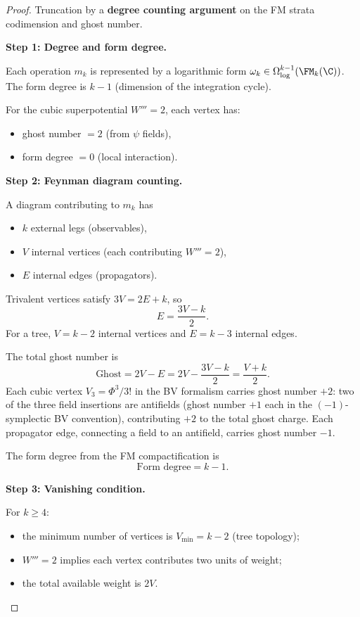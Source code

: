 \begin{proof}
Truncation by a \textbf{degree counting argument} on the FM strata codimension and ghost number.

\textbf{Step 1: Degree and form degree.}

Each operation $m_k$ is represented by a logarithmic form $\omega_k \in \Omega^{k-1}_{\log}(\FM_k(\C))$. The form degree is $k-1$ (dimension of the integration cycle).

For the cubic superpotential $W''' = 2$, each vertex has:
\begin{itemize}
\item ghost number $= 2$ (from $\psi$ fields),
\item form degree $= 0$ (local interaction).
\end{itemize}

\textbf{Step 2: Feynman diagram counting.}

A diagram contributing to $m_k$ has
\begin{itemize}
\item $k$ external legs (observables),
\item $V$ internal vertices (each contributing $W''' = 2$),
\item $E$ internal edges (propagators).
\end{itemize}

Trivalent vertices satisfy $3V = 2E + k$, so
\begin{equation}
E = \frac{3V - k}{2}.
\end{equation}
For a tree, $V = k - 2$ internal vertices and $E = k - 3$ internal edges.

The total ghost number is
\begin{equation}
\text{Ghost} = 2V - E = 2V - \frac{3V-k}{2} = \frac{V + k}{2}.
\end{equation}
Each cubic vertex $V_3 = \Phi^3/3!$ in the BV formalism carries ghost number $+2$: two of the three field insertions are antifields (ghost number $+1$ each in the $(-1)$-symplectic BV convention), contributing $+2$ to the total ghost charge. Each propagator edge, connecting a field to an antifield, carries ghost number $-1$.

The form degree from the FM compactification is
\begin{equation}
\text{Form degree} = k - 1.
\end{equation}

\textbf{Step 3: Vanishing condition.}

For $k \geq 4$:
\begin{itemize}
\item the minimum number of vertices is $V_{\min} = k - 2$ (tree topology);
\item $W''' = 2$ implies each vertex contributes two units of weight;
\item the total available weight is $2V$.
\end{itemize}


\end{proof}
